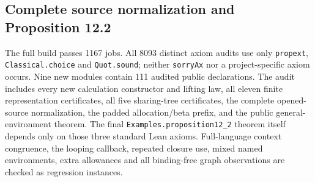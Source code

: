 \subsection{Complete source normalization and Proposition 12.2}
{\raggedright
The full build passes 1167 jobs. All 8093 distinct axiom audits use only
\texttt{propext}, \texttt{Classical.choice} and \texttt{Quot.sound}; neither
\texttt{sorryAx} nor a project-specific axiom occurs. Nine new modules contain
111 audited public declarations. The audit includes every new calculation
constructor and lifting law, all eleven finite representation certificates,
all five sharing-tree certificates, the complete opened-source normalization,
the padded allocation/beta prefix, and the public general-environment theorem.
The final \texttt{Examples.proposition12\_2} theorem itself depends only on
those three standard Lean axioms. Full-language context congruence, the looping
callback, repeated closure use, mixed named environments, extra allowances and
all binding-free graph observations are checked as regression instances.\par}
